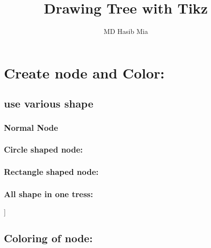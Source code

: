 \documentclass{article}
\title{Drawing Tree with Tikz}
\author{MD Hasib Mia}
\begin{document}
	\maketitle
	\tableofcontents
	\clearpage
	
	
   \section{Create node and Color:}
   
   
	\subsection{use various shape}
	\subsubsection{Normal Node}
	\begin{forest}
		[A]
	\end{forest}
	
	

	\subsubsection{Circle shaped node:}
	\begin{forest}
	\end{forest}
	
	
	\subsubsection{Rectangle shaped node:}
	\begin{forest}
	\end{forest}
	
	
	
	\subsubsection{All shape in one tress:}
	\begin{forest}
		[A,circle,draw[B,rectangle,draw][C]]
	\end{forest}
	
	
	
	\subsection{Coloring of node:}
	\begin{forest}
		[A,circle,draw,color=black,fill=red!20]
	\end{forest}
	
\end{document}
